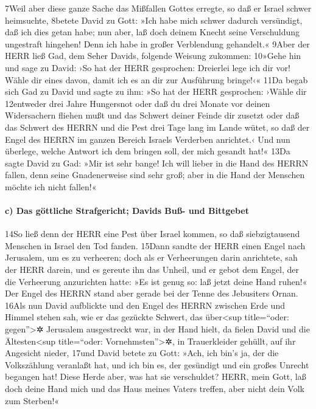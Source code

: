 7Weil aber diese ganze Sache das Mißfallen Gottes erregte, so daß er
Israel schwer heimsuchte, 8betete David zu Gott: »Ich habe mich schwer
dadurch versündigt, daß ich dies getan habe; nun aber, laß doch deinem
Knecht seine Verschuldung ungestraft hingehen! Denn ich habe in großer
Verblendung gehandelt.« 9Aber der HERR ließ Gad, dem Seher Davids,
folgende Weisung zukommen: 10»Gehe hin und sage zu David: ›So hat der
HERR gesprochen: Dreierlei lege ich dir vor! Wähle dir eines davon,
damit ich es an dir zur Ausführung bringe!‹« 11Da begab sich Gad zu
David und sagte zu ihm: »So hat der HERR gesprochen: ›Wähle dir
12entweder drei Jahre Hungersnot oder daß du drei Monate vor deinen
Widersachern fliehen mußt und das Schwert deiner Feinde dir zusetzt oder
daß das Schwert des HERRN und die Pest drei Tage lang im Lande wütet, so
daß der Engel des HERRN im ganzen Bereich Israels Verderben anrichtet.‹
Und nun überlege, welche Antwort ich dem bringen soll, der mich gesandt
hat!« 13Da sagte David zu Gad: »Mir ist sehr bange! Ich will lieber in
die Hand des HERRN fallen, denn seine Gnadenerweise sind sehr groß; aber
in die Hand der Menschen möchte ich nicht fallen!«

\hypertarget{c-das-guxf6ttliche-strafgericht-davids-buuxdf--und-bittgebet}{%
\paragraph{c) Das göttliche Strafgericht; Davids Buß- und
Bittgebet}\label{c-das-guxf6ttliche-strafgericht-davids-buuxdf--und-bittgebet}}

14So ließ denn der HERR eine Pest über Israel kommen, so daß
siebzigtausend Menschen in Israel den Tod fanden. 15Dann sandte der HERR
einen Engel nach Jerusalem, um es zu verheeren; doch als er Verheerungen
darin anrichtete, sah der HERR darein, und es gereute ihn das Unheil,
und er gebot dem Engel, der die Verheerung anzurichten hatte: »Es ist
genug so: laß jetzt deine Hand ruhen!« Der Engel des HERRN stand aber
gerade bei der Tenne des Jebusiters Ornan. 16Als nun David aufblickte
und den Engel des HERRN zwischen Erde und Himmel stehen sah, wie er das
gezückte Schwert, das über\textless sup title=``oder:
gegen''\textgreater✲ Jerusalem ausgestreckt war, in der Hand hielt, da
fielen David und die Ältesten\textless sup title=``oder:
Vornehmsten''\textgreater✲, in Trauerkleider gehüllt, auf ihr Angesicht
nieder, 17und David betete zu Gott: »Ach, ich bin's ja, der die
Volkszählung veranlaßt hat, und ich bin es, der gesündigt und ein großes
Unrecht begangen hat! Diese Herde aber, was hat sie verschuldet? HERR,
mein Gott, laß doch deine Hand mich und das Haus meines Vaters treffen,
aber nicht dein Volk zum Sterben!«

